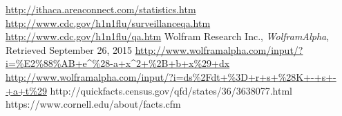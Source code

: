 \documentclass{article}
\begin{document}
\begin{thebibliography}{9}
	\url{http://ithaca.areaconnect.com/statistics.htm}
	\url{http://www.cdc.gov/h1n1flu/surveillanceqa.htm}
	\url{http://www.cdc.gov/h1n1flu/qa.htm}
	Wolfram Research Inc.,
	\emph{WolframAlpha},
	Retrieved September 26, 2015
	\url{http://www.wolframalpha.com/input/?i=\%E2\%88\%AB+e\^\%28-a+x\^2+\%2B+b+x\%29+dx}
	\url{http://www.wolframalpha.com/input/?i=ds\%2Fdt+\%3D+r+s+\%28K+-+s+-+a+t\%29}
	http://quickfacts.census.gov/qfd/states/36/3638077.html
	https://www.cornell.edu/about/facts.cfm
\end{thebibliography}
\end{document}
